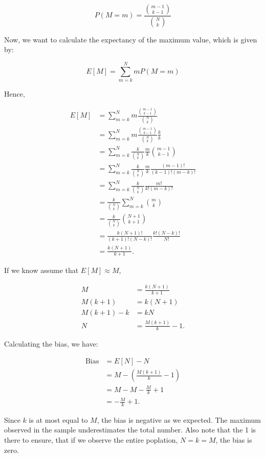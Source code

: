 \documentclass[12pt,a4paper,oneside]{paper}
\begin{document}
\[
P(M = m) = \frac{\binom{m - 1}{k - 1}}{\binom{N}{k}}
\]

Now, we want to calculate the expectancy of the maximum value, which is given by:

\[
E[M] = \sum_{m = k}^{N} m P(M = m)
\]

Hence,

\begin{align*}
E[M] &= \sum_{m = k}^{N} m \frac{\binom{m - 1}{k - 1}}{\binom{N}{k}} \\
&= \sum_{m = k}^{N} m \frac{\binom{m - 1}{k - 1}}{\binom{N}{k}} \frac{k}{k} \\
&= \sum_{m = k}^{N} \frac{k}{\binom{N}{k}}  \frac{m}{k} \binom{m - 1}{k - 1} \\
&= \sum_{m = k}^{N} \frac{k}{\binom{N}{k}}  \frac{m}{k} \frac{(m - 1)!}{(k - 1)! (m - k)!} \\
&= \sum_{m = k}^{N} \frac{k}{\binom{N}{k}} \frac{m!}{k! (m - k)!} \\
&= \frac{k}{\binom{N}{k}} \sum_{m = k}^{N} \binom{m}{k} \\
&= \frac{k}{\binom{N}{k}} \binom{N + 1}{k + 1} \\
&= \frac{k (N + 1)!}{(k + 1)! (N - k)!} \frac{k! (N - k)!}{N!} \\
&= \frac{k (N + 1)}{k + 1}.
\end{align*}

If we know assume that $E[M] \approx  M$, 

\begin{align*}
M &= \frac{k (N + 1)}{k + 1} \\
M(k + 1) &= k (N + 1) \\
M(k + 1) - k &= kN \\
N &= \frac{M(k + 1)}{k} - 1.
\end{align*}

Calculating the bias, we have:

\begin{align*}
\text{Bias} &= E[N] - N \\
&= M - (\frac{M(k + 1)}{k} - 1) \\
&= M - M - \frac{M}{k} + 1 \\
&= - \frac{M}{k} + 1.
\end{align*}

Since $k$ is at most equal to $M$, the bias is negative as we expected. The maximum observed in the sample underestimates the total number. 
Also note that the 1 is there to ensure, that if we observe the entire poplation, $N=k=M$, the bias is zero.
\end{document}
